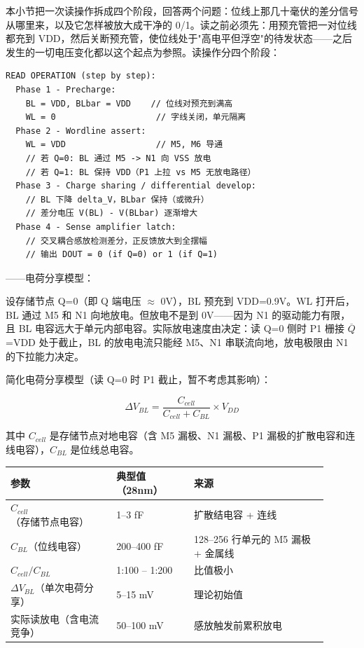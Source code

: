 
本小节把一次读操作拆成四个阶段，回答两个问题：位线上那几十毫伏的差分信号从哪里来，以及它怎样被放大成干净的 0/1。读之前必须先：用预充管把一对位线都充到 VDD，然后关断预充管，使位线处于"高电平但浮空"的待发状态——之后发生的一切电压变化都以这个起点为参照。读操作分四个阶段：

\begin{lstlisting}
READ OPERATION (step by step):
  Phase 1 - Precharge:
    BL = VDD, BLbar = VDD    // 位线对预充到满高
    WL = 0                    // 字线关闭，单元隔离
  Phase 2 - Wordline assert:
    WL = VDD                  // M5, M6 导通
    // 若 Q=0: BL 通过 M5 -> N1 向 VSS 放电
    // 若 Q=1: BL 保持 VDD（P1 上拉 vs M5 无放电路径）
  Phase 3 - Charge sharing / differential develop:
    // BL 下降 delta_V，BLbar 保持（或微升）
    // 差分电压 V(BL) - V(BLbar) 逐渐增大
  Phase 4 - Sense amplifier latch:
    // 交叉耦合感放检测差分，正反馈放大到全摆幅
    // 输出 DOUT = 0 (if Q=0) or 1 (if Q=1)
\end{lstlisting}

——电荷分享模型：

设存储节点 Q=0（即 Q 端电压 $\approx$ 0V），BL 预充到 VDD=0.9V。WL 打开后，BL 通过 M5 和 N1 向地放电。但放电不是到 0V——因为 N1 的驱动能力有限，且 BL 电容远大于单元内部电容。实际放电速度由决定：读 Q=0 侧时 P1 栅接 $\overline{Q}$=VDD 处于截止，BL 的放电电流只能经 M5、N1 串联流向地，放电极限由 N1 的下拉能力决定。

简化电荷分享模型（读 Q=0 时 P1 截止，暂不考虑其影响）：

$$\Delta V_{BL} = \frac{C_{cell}}{C_{cell} + C_{BL}} \times V_{DD}$$

其中 $C_{cell}$ 是存储节点对地电容（含 M5 漏极、N1 漏极、P1 漏极的扩散电容和连线电容），$C_{BL}$ 是位线总电容。

\begin{longtable}{L{0.30\linewidth}L{0.22\linewidth}L{0.38\linewidth}}
\toprule
参数 & 典型值（28nm） & 来源 \\
\midrule
$C_{cell}$（存储节点电容） & 1--3 fF & 扩散结电容 + 连线 \\
$C_{BL}$（位线电容） & 200--400 fF & 128--256 行单元的 M5 漏极 + 金属线 \\
$C_{cell}/C_{BL}$ & 1:100 -- 1:200 & 比值极小 \\
$\Delta V_{BL}$（单次电荷分享） & 5--15 mV & 理论初始值 \\
实际读放电（含电流竞争） & 50--100 mV & 感放触发前累积放电 \\
\bottomrule
\end{longtable}

